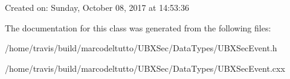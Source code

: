 Created on\-: Sunday, October 08, 2017 at 14\-:53\-:36 

The documentation for this class was generated from the following files\-:\begin{DoxyCompactItemize}
\item 
/home/travis/build/marcodeltutto/\-U\-B\-X\-Sec/\-Data\-Types/U\-B\-X\-Sec\-Event.\-h\item 
/home/travis/build/marcodeltutto/\-U\-B\-X\-Sec/\-Data\-Types/U\-B\-X\-Sec\-Event.\-cxx\end{DoxyCompactItemize}
